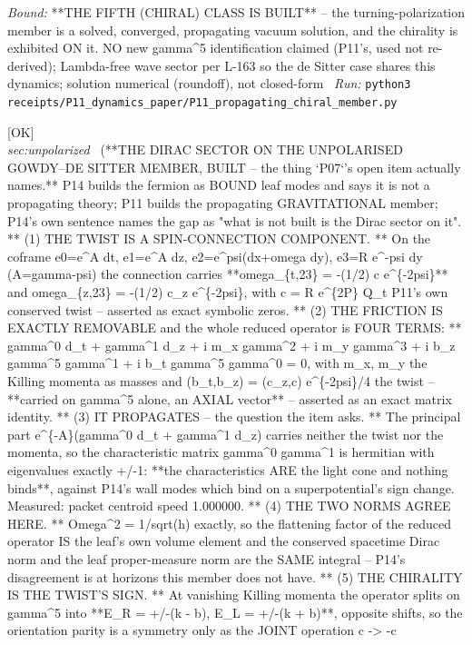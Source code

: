 \begin{description}
 \emph{Bound:} **THE FIFTH (CHIRAL) CLASS IS BUILT** -- the turning-polarization member is a solved, converged, propagating vacuum solution, and the chirality is exhibited ON it. NO new gamma\textasciicircum{}5 identification claimed (P11's, used not re-derived); Lambda-free wave sector per L-163 so the de Sitter case shares this dynamics; solution numerical (roundoff), not closed-form
\ \emph{Run:} \texttt{python3 receipts/P11\_dynamics\_paper/P11\_propagating\_chiral\_member.py}
\item[\rcptlabel{C50_the_dirac_sector_propagates_and_its_chirality_is_the_twists_sign}{P11R9}\textbf{P11R9}\quad\texttt{C50\_the\_dirac\_sector\_propagates\_and\_its\_chirality\_is\_the\_twists\_sign}]\hfill\textsf{[OK]}\\
\textit{sec:unpolarized} \ (**THE DIRAC SECTOR ON THE UNPOLARISED GOWDY--DE SITTER MEMBER, BUILT -- the thing `P07`'s open item actually names.** P14 builds the fermion as BOUND leaf modes and says it is not a propagating theory; P11 builds the propagating GRAVITATIONAL member; P14's own sentence names the gap as "what is not built is the Dirac sector on it". ** (1) THE TWIST IS A SPIN-CONNECTION COMPONENT. ** On the coframe e0=e\textasciicircum{}A dt, e1=e\textasciicircum{}A dz, e2=e\textasciicircum{}psi(dx+omega dy), e3=R e\textasciicircum{}-psi dy (A=gamma-psi) the connection carries **omega\_\{t,23\} = -(1/2) c e\textasciicircum{}\{-2psi\}** and omega\_\{z,23\} = -(1/2) c\_z e\textasciicircum{}\{-2psi\}, with c = R e\textasciicircum{}\{2P\} Q\_t P11's own conserved twist -- asserted as exact symbolic zeros. ** (2) THE FRICTION IS EXACTLY REMOVABLE and the whole reduced operator is FOUR TERMS: ** gamma\textasciicircum{}0 d\_t + gamma\textasciicircum{}1 d\_z + i m\_x gamma\textasciicircum{}2 + i m\_y gamma\textasciicircum{}3 + i b\_z gamma\textasciicircum{}5 gamma\textasciicircum{}1 + i b\_t gamma\textasciicircum{}5 gamma\textasciicircum{}0 = 0, with m\_x, m\_y the Killing momenta as masses and (b\_t,b\_z) = (c\_z,c) e\textasciicircum{}\{-2psi\}/4 the twist -- **carried on gamma\textasciicircum{}5 alone, an AXIAL vector** -- asserted as an exact matrix identity. ** (3) IT PROPAGATES -- the question the item asks. ** The principal part e\textasciicircum{}\{-A\}(gamma\textasciicircum{}0 d\_t + gamma\textasciicircum{}1 d\_z) carries neither the twist nor the momenta, so the characteristic matrix gamma\textasciicircum{}0 gamma\textasciicircum{}1 is hermitian with eigenvalues exactly +/-1: **the characteristics ARE the light cone and nothing binds**, against P14's wall modes which bind on a superpotential's sign change. Measured: packet centroid speed 1.000000. ** (4) THE TWO NORMS AGREE HERE. ** Omega\textasciicircum{}2 = 1/sqrt(h) exactly, so the flattening factor of the reduced operator IS the leaf's own volume element and the conserved spacetime Dirac norm and the leaf proper-measure norm are the SAME integral -- P14's disagreement is at horizons this member does not have. ** (5) THE CHIRALITY IS THE TWIST'S SIGN. ** At vanishing Killing momenta the operator splits on gamma\textasciicircum{}5 into **E\_R = +/-(k - b), E\_L = +/-(k + b)**, opposite shifts, so the orientation parity is a symmetry only as the JOINT operation c -> -c 
\end{description}
